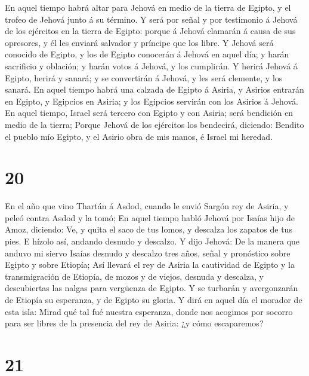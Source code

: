  En aquel tiempo habrá altar para Jehová en medio de la
tierra de Egipto, y el trofeo de Jehová junto á su término.
 Y será por señal y por testimonio á Jehová de los
ejércitos en la tierra de Egipto: porque á Jehová clamarán á causa de
sus opresores, y él les enviará salvador y príncipe que los libre.
 Y Jehová será conocido de Egipto, y los de Egipto
conocerán á Jehová en aquel día; y harán sacrificio y oblación; y harán
votos á Jehová, y los cumplirán.  Y herirá Jehová á Egipto,
herirá y sanará; y se convertirán á Jehová, y les será clemente, y los
sanará.  En aquel tiempo habrá una calzada de Egipto á
Asiria, y Asirios entrarán en Egipto, y Egipcios en Asiria; y los
Egipcios servirán con los Asirios á Jehová.  En aquel
tiempo, Israel será tercero con Egipto y con Asiria; será bendición en
medio de la tierra;  Porque Jehová de los ejércitos los
bendecirá, diciendo: Bendito el pueblo mío Egipto, y el Asirio obra de
mis manos, é Israel mi heredad.

\hypertarget{section-19}{%
\section{20}\label{section-19}}

 En el año que vino Thartán á Asdod, cuando le envió Sargón
rey de Asiria, y peleó contra Asdod y la tomó;  En aquel
tiempo habló Jehová por Isaías hijo de Amoz, diciendo: Ve, y quita el
saco de tus lomos, y descalza los zapatos de tus pies. E hízolo así,
andando desnudo y descalzo.  Y dijo Jehová: De la manera que
anduvo mi siervo Isaías desnudo y descalzo tres años, señal y pronóstico
sobre Egipto y sobre Etiopía;  Así llevará el rey de Asiria
la cautividad de Egipto y la transmigración de Etiopía, de mozos y de
viejos, desnuda y descalza, y descubiertas las nalgas para vergüenza de
Egipto.  Y se turbarán y avergonzarán de Etiopía su
esperanza, y de Egipto su gloria.  Y dirá en aquel día el
morador de esta isla: Mirad qué tal fué nuestra esperanza, donde nos
acogimos por socorro para ser libres de la presencia del rey de Asiria:
¿y cómo escaparemos?

\hypertarget{section-20}{%
\section{21}\label{section-20}}

